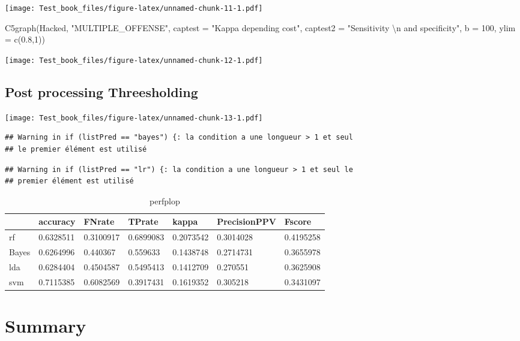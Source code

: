 \documentclass[
]{report}
\newenvironment{Shaded}{\begin{snugshade}}{\end{snugshade}}
\newcommand{\AttributeTok}[1]{\textcolor[rgb]{0.77,0.63,0.00}{#1}}
\newcommand{\DecValTok}[1]{\textcolor[rgb]{0.00,0.00,0.81}{#1}}
\newcommand{\FloatTok}[1]{\textcolor[rgb]{0.00,0.00,0.81}{#1}}
\newcommand{\FunctionTok}[1]{\textcolor[rgb]{0.00,0.00,0.00}{#1}}
\newcommand{\NormalTok}[1]{#1}
\newcommand{\SpecialCharTok}[1]{\textcolor[rgb]{0.00,0.00,0.00}{#1}}
\newcommand{\StringTok}[1]{\textcolor[rgb]{0.31,0.60,0.02}{#1}}
\begin{document}
\texttt{[image: Test\_book\_files/figure-latex/unnamed-chunk-11-1.pdf]}

\begin{Shaded}
\begin{Highlighting}[]
\FunctionTok{C5graph}\NormalTok{(Hacked, }\StringTok{"MULTIPLE\_OFFENSE"}\NormalTok{, }\AttributeTok{captest =} \StringTok{"Kappa depending cost"}\NormalTok{, }\AttributeTok{captest2 =} \StringTok{"Sensitivity }\SpecialCharTok{\textbackslash{}n}\StringTok{ and specificity"}\NormalTok{, }\AttributeTok{b =} \DecValTok{100}\NormalTok{, }\AttributeTok{ylim =} \FunctionTok{c}\NormalTok{(}\FloatTok{0.8}\NormalTok{,}\DecValTok{1}\NormalTok{))}
\end{Highlighting}
\end{Shaded}

\texttt{[image: Test\_book\_files/figure-latex/unnamed-chunk-12-1.pdf]}

\hypertarget{post-processing-threesholding}{%
\section{Post processing Threesholding}\label{post-processing-threesholding}}

\texttt{[image: Test\_book\_files/figure-latex/unnamed-chunk-13-1.pdf]}

\begin{verbatim}
## Warning in if (listPred == "bayes") {: la condition a une longueur > 1 et seul
## le premier élément est utilisé
\end{verbatim}

\begin{verbatim}
## Warning in if (listPred == "lr") {: la condition a une longueur > 1 et seul le
## premier élément est utilisé
\end{verbatim}

\begin{table}

\caption{\label{tab:unnamed-chunk-14}perfplop}
\centering
\begin{tabular}[t]{l|l|l|l|l|l|l}
\hline
  & accuracy & FNrate & TPrate & kappa & PrecisionPPV & Fscore\\
\hline
rf & 0.6328511 & 0.3100917 & 0.6899083 & 0.2073542 & 0.3014028 & 0.4195258\\
\hline
Bayes & 0.6264996 & 0.440367 & 0.559633 & 0.1438748 & 0.2714731 & 0.3655978\\
\hline
lda & 0.6284404 & 0.4504587 & 0.5495413 & 0.1412709 & 0.270551 & 0.3625908\\
\hline
svm & 0.7115385 & 0.6082569 & 0.3917431 & 0.1619352 & 0.305218 & 0.3431097\\
\hline
\end{tabular}
\end{table}

\hypertarget{summary}{%
\chapter{Summary}\label{summary}}

  
\end{document}
